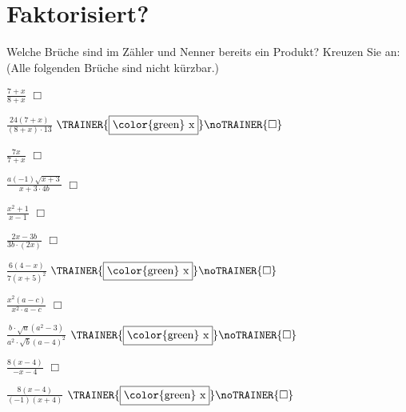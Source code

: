\newpage
\section{Faktorisiert?}

Welche Brüche sind im Zähler und Nenner bereits ein Produkt? Kreuzen Sie an:
(Alle folgenden Brüche sind nicht kürzbar.)

\newcommand{\BoxTT}{\TRAINER{\fbox{\color{green} x}}\noTRAINER{\Box}}

\begin{bbwAufgabenBlock}
\item $\frac{7+x}{8+x}$ $\Box{}$ 

\item $\frac{24(7+x)}{(8+x)\cdot{}13}$ $\BoxTT$ 

\item $\frac{7x}{7+x}$ $\Box{}$ 

\item $\frac{a(-1)\sqrt{x+3}}{x+3\cdot{}4b}$ $\Box{}$ 

\item $\frac{x^2+1}{x-1}$ $\Box{}$ 

\item $\frac{2x-3b}{3b\cdot{}(2x)}$ $\Box{}$ 

\item $\frac{6(4-x)}{7(x+5)^2}$ $\BoxTT$ 

\item $\frac{x^2(a-c)}{x^2\cdot{}a -c}$ $\Box{}$ 

\item $\frac{b\cdot{}\sqrt{a}(a^2-3)}{a^2\cdot{}\sqrt{b}(a-4)^2}$ $\BoxTT$ 

\item $\frac{8(x-4)}{-x-4}$ $\Box{}$ 

\item $\frac{8(x-4)}{(-1)(x+4)}$ $\BoxTT$ 


\end{bbwAufgabenBlock}
\newpage
